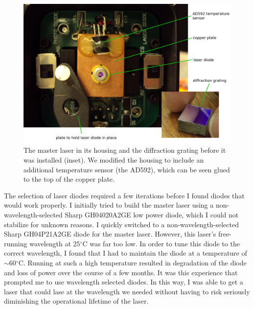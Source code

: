 \begin{figure}
\centering
\includegraphics[width=1\textwidth]{laser_on_in_housing.JPG}
\caption[Photographs of master laser components]{The master laser in its housing and the diffraction grating before it was installed (inset). We modified the housing to include an additional temperature sensor (the AD592), which can be seen glued to the top of the copper plate.\label{master_laser_interior_photo}
}
\end{figure}


The selection of laser diodes required a few iterations before I found diodes that would work properly. I initially tried to build the master laser using a non-wavelength-selected Sharp GH04020A2GE low power diode, which I could not stabilize for unknown reasons. I quickly switched to a non-wavelength-selected Sharp GH04P21A2GE diode for the master laser. However, this laser's free-running wavelength at 25$^\circ$C was far too low. In order to tune this diode to the correct wavelength, I found that I had to maintain the diode at a temperature of $\sim$60$^\circ$C. Running at such a high temperature resulted in degradation of the diode and loss of power over the course of a few months. It was this experience that prompted me to use wavelength selected diodes. In this way, I was able to get a laser that could lase at the wavelength we needed without having to risk seriously diminishing the operational lifetime of the laser.


